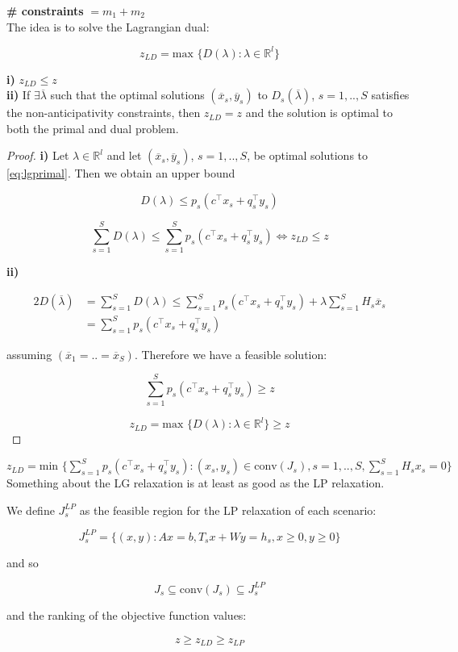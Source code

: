 \hspace{2cm}\textbf{\# constraints} $ = m_1 + m_2$\\

The idea is to solve the Lagrangian dual:

\[
z_{LD} = \textrm{max } \{D(\lambda) : \lambda \in \mathbb{R}^l\}
\]

\begin{proposition}\hfill\break
{\bf i)}  $z_{LD} \leq z$\\
{\bf ii)} If $\exists \overline{\lambda}$ such that the optimal solutions $(\overline{x}_s,\overline{y}_s)$
to $D_s(\overline{\lambda})$, $s=1,..,S$ satisfies the non-anticipativity constraints, then $z_{LD} = z$ and
the solution is optimal to both the primal and dual problem.
\end{proposition}

\begin{proof}
{\bf i)} Let $\lambda \in \mathbb{R}^l$ and let $(\overline{x}_s,\overline{y}_s)$, $s=1,..,S$, be optimal
solutions to \ref{eq:lgprimal}. Then we obtain an upper bound 

\[
D(\lambda)\leq p_s(c^\top x_s + q_s^\top y_s)
\]

\[
\sum_{s=1}^S D(\lambda) \leq \sum_{s=1}^S p_s(c^\top x_s + q_s^\top y_s) \Leftrightarrow z_{LD} \leq z
\]

{\bf ii)}

\begin{alignat*}{2}
D(\overline{\lambda}) &= \sum_{s=1}^S D(\lambda) \leq \sum_{s=1}^S p_s(c^\top x_s + q_s^\top y_s)
  + \lambda\sum_{s=1}^S H_s\overline{x}_s\\
& = \sum_{s=1}^S p_s(c^\top x_s + q_s^\top y_s)
\end{alignat*}

assuming $(\overline{x}_1 = .. = \overline{x}_S)$. Therefore we have a feasible solution:

\[
\sum_{s=1}^S p_s(c^\top x_s + q_s^\top y_s) \geq z
\]

\[
z_{LD} = \textrm{max } \{ D(\lambda) : \lambda \in \mathbb{R}^l \} \geq z
\]
\end{proof}

\begin{proposition}\hfill\break
$z_{LD} = \textrm{min }\{ \sum_{s=1}^S p_s (c^\top x_s + q_s^\top y_s) : (x_s, y_s) \in \textrm{conv}(J_s), s=1,..,S, \sum_{s=1}^S H_sx_s = 0\}$
Something about the LG relaxation is at least as good as the LP relaxation.

We define $J_s^{LP}$ as the feasible region for the LP relaxation of each scenario:

\[
J_s^{LP} = \{ (x,y) : Ax=b, T_s x + Wy = h_s, x\geq 0, y\geq0 \}
\]

and so 

\[
J_s \subseteq \textrm{conv}(J_s) \subseteq J_s^{LP}
\]

and the ranking of the objective function values:

\[
z\geq z_{LD} \geq z_{LP}
\]
\end{proposition}

